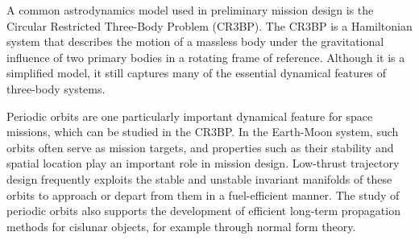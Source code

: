     A common astrodynamics model used in preliminary mission design is the Circular Restricted Three-Body Problem (CR3BP).
    The CR3BP is a Hamiltonian system that describes the motion of a massless body under the gravitational influence of two primary bodies in a rotating frame of reference. 
    Although it is a simplified model, it still captures many of the essential dynamical features of three-body systems.
    
    Periodic orbits are one particularly important dynamical feature for space missions, which can be studied in the CR3BP. 
    In the Earth-Moon system, such orbits often serve as mission targets, and properties such as their stability and spatial location play an important role in mission design. 
    Low-thrust trajectory design frequently exploits the stable and unstable invariant manifolds of these orbits to approach or depart from them in a fuel-efficient manner. 
    The study of periodic orbits also supports the development of efficient long-term propagation methods for cislunar objects, for example through normal form theory.

